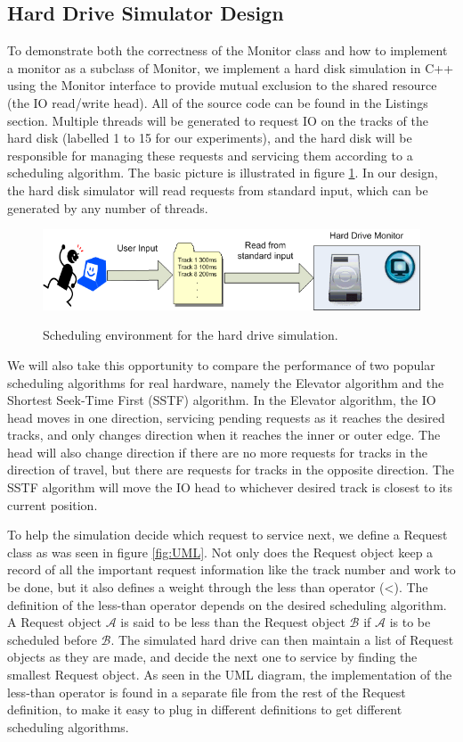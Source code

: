 \documentclass{report}
\begin{document}
\subsection{Hard Drive Simulator Design}
To demonstrate both the correctness of the Monitor class and how to implement a monitor as
a subclass of Monitor, we implement a hard disk simulation in C++ using the Monitor
interface to provide mutual exclusion to the shared resource (the IO read/write head).
All of the source code can be found in the Listings section.
Multiple threads will be generated to request IO on the tracks of the hard disk (labelled
1 to 15 for our experiments), and the hard disk will be responsible for managing these
requests and servicing them according to a scheduling algorithm. The basic picture is
illustrated in figure \ref{fig:sched}. In our design, the hard disk simulator will read
requests from standard input, which can be generated by any number of threads.
\begin{figure}[htb!]
    \centering
    \includegraphics[scale=0.6]{Scheduling_Env.png}
    \label{fig:sched}
    \caption{Scheduling environment for the hard drive simulation.}
\end{figure}

We will also take this opportunity to compare the performance of two popular scheduling
algorithms for real hardware, namely the Elevator algorithm and the Shortest Seek-Time
First (SSTF) algorithm. In the Elevator algorithm, the IO head moves in one direction,
servicing pending requests as it reaches the desired tracks, and only changes direction
when it reaches the inner or outer edge. The head will also change direction if there are 
no more requests for tracks in the direction of travel, but there are requests for tracks
in the opposite direction. The SSTF algorithm will move the IO head to whichever desired
track is closest to its current position.

To help the simulation decide which request to service next, we define a Request class as
was seen in figure \ref{fig:UML}. Not only does the Request object keep a record of all
the important request information like the track number and work to be done, but it also
defines a weight through the less than operator (<). The definition of the less-than
operator depends on the desired scheduling algorithm. A Request object $\mathcal{A}$ is said to be
less than the Request object $\mathcal{B}$ if $\mathcal{A}$ is to be scheduled before
$\mathcal{B}$. The simulated hard drive can then maintain a list of
Request objects as they are made, and decide the next one to service by finding the
smallest Request object. As seen in the UML diagram, the implementation of the less-than
operator is found in a separate file from the rest of the Request definition, to make it
easy to plug in different definitions to get different scheduling algorithms.
\end{document}
